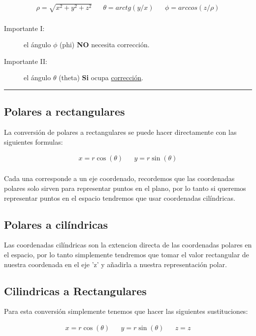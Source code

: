 \documentclass{article}
\begin{document}
\[\begin{aligned}
 \rho = \sqrt{x^2+y^2+z^2} && 
 \theta = arctg\left( y/x \right)  &&
 \phi = arccos\left( z/\rho \right) \\
\end{aligned}\] 

\begin{description}
\item[{Importante I:}] el ángulo \(\phi\) (phi) \textbf{NO} necesita corrección.
\item[{Importante II:}] el ángulo \(\theta\) (theta) \textbf{Si} ocupa \hyperref[tab:org5b24ba4]{corrección}.
\end{description}

\noindent\rule{\textwidth}{0.5pt}

\subsection{Polares a rectangulares}
\label{sec:orgab27451}
La conversión de polares a rectangulares se puede hacer directamente con las siguientes formulas: 

\[\begin{aligned}
 x = r \cos(\theta) && y = r \sin(\theta) \\
\end{aligned}\] 

Cada una corresponde a un eje coordenado, recordemos que las coordenadas polares solo sirven para representar puntos en el plano, por lo tanto si queremos representar puntos en el espacio tendremos que usar coordenadas cilíndricas.

\subsection{Polares a cilíndricas}
\label{sec:org1b1166b}
Las coordenadas cilíndricas son la extencion directa de las coordenadas polares en el espacio, por lo tanto simplemente tendremos que tomar el valor rectangular de nuestra coordenada en el eje 'z' y añadirla a nuestra representación polar.

\subsection{Cilindricas a Rectangulares}
\label{sec:orgfe54f7a}
Para esta conversión simplemente tenemos que hacer las siguientes sustituciones:

\[\begin{aligned}
 x = r \cos(\theta) && y = r \sin(\theta) && z = z \\
\end{aligned}\] 
\end{document}
